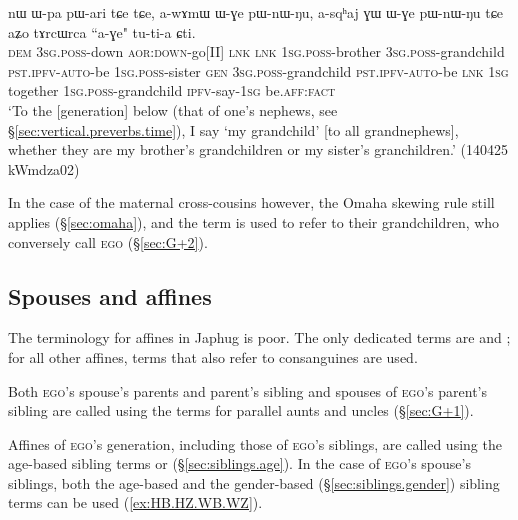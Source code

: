 \begin{exe}
\ex \label{ex:ZChCh.BChCh}
\gll nɯ ɯ-pa pɯ-ari tɕe tɕe, a-wɤmɯ ɯ-ɣe pɯ-nɯ-ŋu, a-sqʰaj ɣɯ ɯ-ɣe pɯ-nɯ-ŋu tɕe aʑo tɤrcɯrca ``a-ɣe" tu-ti-a ɕti. \\
\textsc{dem} \textsc{3sg}.\textsc{poss}-down \textsc{aor}:\textsc{down}-go[II] \textsc{lnk} \textsc{lnk} \textsc{1sg}.\textsc{poss}-brother \textsc{3sg}.\textsc{poss}-grandchild \textsc{pst}.\textsc{ipfv}-\textsc{auto}-be \textsc{1sg}.\textsc{poss}-sister \textsc{gen} \textsc{3sg}.\textsc{poss}-grandchild \textsc{pst}.\textsc{ipfv}-\textsc{auto}-be \textsc{lnk} \textsc{1sg} together \textsc{1sg}.\textsc{poss}-grandchild \textsc{ipfv}-say-\textsc{1sg} be.\textsc{aff}:\textsc{fact} \\
\glt `To the [generation] below (that of one's nephews, see §\ref{sec:vertical.preverbs.time}), I say  `my grandchild' [to all grandnephews], whether they are my brother's grandchildren or my sister's granchildren.' (140425 kWmdza02)
\end{exe}

In the case of the maternal cross-cousins however, the Omaha skewing rule still applies (§\ref{sec:omaha}), and the term  is used to refer to their grandchildren, who conversely call \textsc{ego}  (§\ref{sec:G+2}).


\subsection{Spouses and affines} \label{sec:spouses}
The terminology for affines in Japhug is poor. The only dedicated terms are  and ; for all other affines, terms that also refer to consanguines are used.

Both \textsc{ego}'s spouse's parents and parent's sibling and spouses of \textsc{ego}'s parent's sibling are called using the terms for parallel aunts and uncles (§\ref{sec:G+1}).

Affines of \textsc{ego}'s generation, including those of \textsc{ego}'s siblings, are called using the age-based sibling terms  or  (§\ref{sec:siblings.age}). In the case of \textsc{ego}'s spouse's siblings, both the age-based and the gender-based (§\ref{sec:siblings.gender}) sibling terms can be used (\ref{ex:HB.HZ.WB.WZ}).


